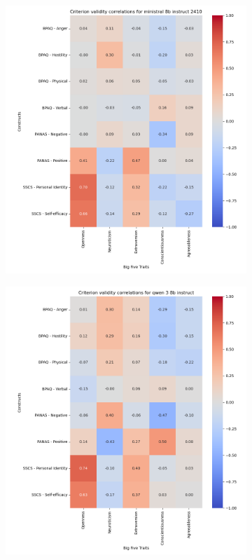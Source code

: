 \documentclass{article}
\begin{document}
\begin{figure}[H]
    \centering
    \begin{subfigure}{0.38\textwidth}
        \centering
        \includegraphics[width=\linewidth]{../Prompt_code/plots/ministral-8b-instruct-2410/crit_val_correlation.png}
    \end{subfigure}
    \begin{subfigure}{0.38\textwidth}
        \centering
        \includegraphics[width=\linewidth]{../Prompt_code/plots/qwen-3-8b-instruct/crit_val_correlation.png}
    \end{subfigure}
\end{figure}
\end{document}

